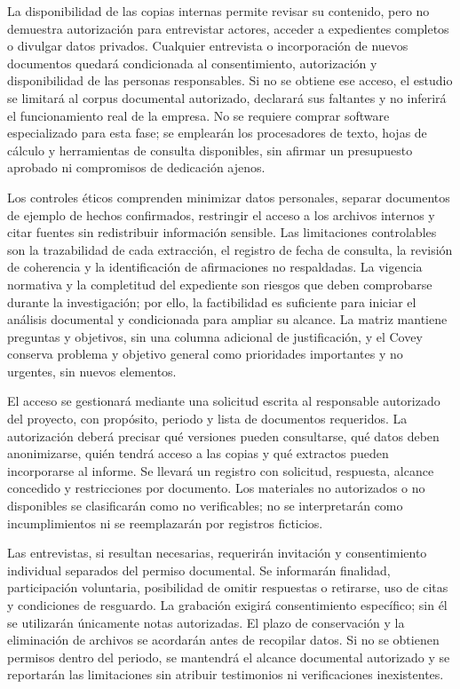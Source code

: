 {La disponibilidad de las copias internas permite revisar su contenido, pero no demuestra autorización para entrevistar actores, acceder a expedientes completos o divulgar datos privados. Cualquier entrevista o incorporación de nuevos documentos quedará condicionada al consentimiento, autorización y disponibilidad de las personas responsables. Si no se obtiene ese acceso, el estudio se limitará al corpus documental autorizado, declarará sus faltantes y no inferirá el funcionamiento real de la empresa. No se requiere comprar software especializado para esta fase; se emplearán los procesadores de texto, hojas de cálculo y herramientas de consulta disponibles, sin afirmar un presupuesto aprobado ni compromisos de dedicación ajenos.


Los controles éticos comprenden minimizar datos personales, separar documentos de ejemplo de hechos confirmados, restringir el acceso a los archivos internos y citar fuentes sin redistribuir información sensible. Las limitaciones controlables son la trazabilidad de cada extracción, el registro de fecha de consulta, la revisión de coherencia y la identificación de afirmaciones no respaldadas. La vigencia normativa y la completitud del expediente son riesgos que deben comprobarse durante la investigación; por ello, la factibilidad es suficiente para iniciar el análisis documental y condicionada para ampliar su alcance. La matriz mantiene preguntas y objetivos, sin una columna adicional de justificación, y el Covey conserva problema y objetivo general como prioridades importantes y no urgentes, sin nuevos elementos.


El acceso se gestionará mediante una solicitud escrita al responsable autorizado del proyecto, con propósito, periodo y lista de documentos requeridos. La autorización deberá precisar qué versiones pueden consultarse, qué datos deben anonimizarse, quién tendrá acceso a las copias y qué extractos pueden incorporarse al informe. Se llevará un registro con solicitud, respuesta, alcance concedido y restricciones por documento. Los materiales no autorizados o no disponibles se clasificarán como no verificables; no se interpretarán como incumplimientos ni se reemplazarán por registros ficticios.


Las entrevistas, si resultan necesarias, requerirán invitación y consentimiento individual separados del permiso documental. Se informarán finalidad, participación voluntaria, posibilidad de omitir respuestas o retirarse, uso de citas y condiciones de resguardo. La grabación exigirá consentimiento específico; sin él se utilizarán únicamente notas autorizadas. El plazo de conservación y la eliminación de archivos se acordarán antes de recopilar datos. Si no se obtienen permisos dentro del periodo, se mantendrá el alcance documental autorizado y se reportarán las limitaciones sin atribuir testimonios ni verificaciones inexistentes.


}
